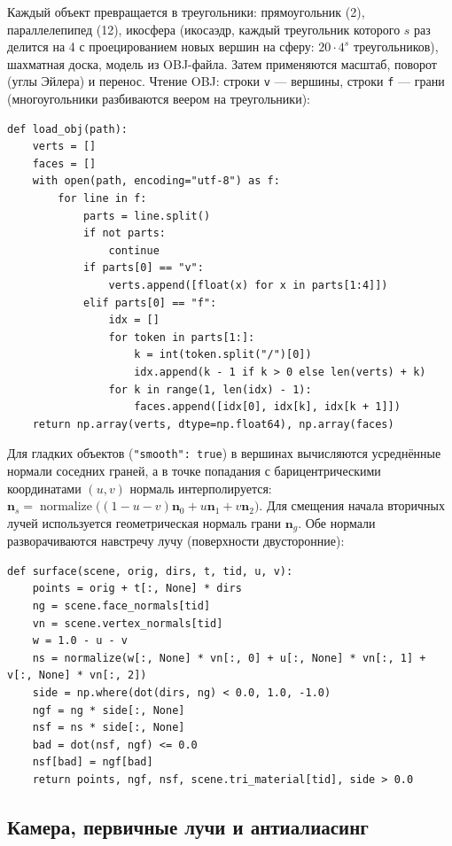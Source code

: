 \documentclass[12pt,a4paper]{article}
\newcommand{\vect}[1]{\mathbf{#1}}
\newcommand{\nrm}{\operatorname{normalize}}
\begin{document}
Каждый объект превращается в треугольники: прямоугольник (2), параллелепипед (12), икосфера (икосаэдр,
каждый треугольник которого $s$ раз делится на 4 с проецированием новых вершин на сферу: $20\cdot4^s$
треугольников), шахматная доска, модель из OBJ-файла. Затем применяются масштаб, поворот (углы Эйлера) и перенос.
Чтение OBJ: строки \texttt{v} — вершины, строки \texttt{f} — грани (многоугольники разбиваются веером на треугольники):

\begin{lstlisting}
def load_obj(path):
    verts = []
    faces = []
    with open(path, encoding="utf-8") as f:
        for line in f:
            parts = line.split()
            if not parts:
                continue
            if parts[0] == "v":
                verts.append([float(x) for x in parts[1:4]])
            elif parts[0] == "f":
                idx = []
                for token in parts[1:]:
                    k = int(token.split("/")[0])
                    idx.append(k - 1 if k > 0 else len(verts) + k)
                for k in range(1, len(idx) - 1):
                    faces.append([idx[0], idx[k], idx[k + 1]])
    return np.array(verts, dtype=np.float64), np.array(faces)
\end{lstlisting}

Для гладких объектов (\texttt{"smooth": true}) в вершинах вычисляются усреднённые нормали соседних граней, а в точке
попадания с барицентрическими координатами $(u,v)$ нормаль интерполируется:
$\vect n_s = \nrm\big((1-u-v)\vect n_0 + u\vect n_1 + v\vect n_2\big)$. Для смещения начала вторичных лучей
используется геометрическая нормаль грани $\vect n_g$. Обе нормали разворачиваются навстречу лучу (поверхности двусторонние):

\begin{lstlisting}
def surface(scene, orig, dirs, t, tid, u, v):
    points = orig + t[:, None] * dirs
    ng = scene.face_normals[tid]
    vn = scene.vertex_normals[tid]
    w = 1.0 - u - v
    ns = normalize(w[:, None] * vn[:, 0] + u[:, None] * vn[:, 1] + v[:, None] * vn[:, 2])
    side = np.where(dot(dirs, ng) < 0.0, 1.0, -1.0)
    ngf = ng * side[:, None]
    nsf = ns * side[:, None]
    bad = dot(nsf, ngf) <= 0.0
    nsf[bad] = ngf[bad]
    return points, ngf, nsf, scene.tri_material[tid], side > 0.0
\end{lstlisting}

\subsection{Камера, первичные лучи и антиалиасинг}
\end{document}
